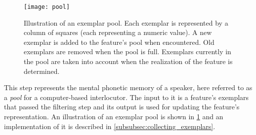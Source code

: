 \begin{figure}[t]
	\centering
	\texttt{[image: pool]}
	\caption[The exemplar pool]
		{Illustration of an exemplar pool.
		Each exemplar is represented by a column of squares (each representing a numeric value).
		A new exemplar is added to the feature's pool when encountered.
		Old exemplars are removed when the pool is full.
		Exemplars currently in the pool are taken into account when the realization of the feature is determined.}
	\label{fig:exemplar_pool}
\end{figure}
%
This step represents the mental phonetic memory of a speaker, here referred to as a \emph{pool} for a computer-based interlocutor.
The input to it is a feature's exemplars that passed the filtering step and its output is used for updating the feature's representation.
An illustration of an exemplar pool is shown in \cref{fig:exemplar_pool} and an implementation of it is described in \cref{subsubsec:collecting_exemplars}.

